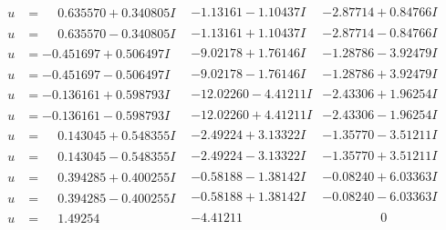 \documentclass[1p]{elsarticle_modified}
\theoremstyle{definition}
\begin{document}
$$\begin{array}{c|c|c}
\begin{aligned}
u &= \phantom{-}0.635570 + 0.340805 I\end{aligned}
 & -1.13161 - 1.10437 I & -2.87714 + 0.84766 I \\ \hline\begin{aligned}
u &= \phantom{-}0.635570 - 0.340805 I\end{aligned}
 & -1.13161 + 1.10437 I & -2.87714 - 0.84766 I \\ \hline\begin{aligned}
u &= -0.451697 + 0.506497 I\end{aligned}
 & -9.02178 + 1.76146 I & -1.28786 - 3.92479 I \\ \hline\begin{aligned}
u &= -0.451697 - 0.506497 I\end{aligned}
 & -9.02178 - 1.76146 I & -1.28786 + 3.92479 I \\ \hline\begin{aligned}
u &= -0.136161 + 0.598793 I\end{aligned}
 & -12.02260 - 4.41211 I & -2.43306 + 1.96254 I \\ \hline\begin{aligned}
u &= -0.136161 - 0.598793 I\end{aligned}
 & -12.02260 + 4.41211 I & -2.43306 - 1.96254 I \\ \hline\begin{aligned}
u &= \phantom{-}0.143045 + 0.548355 I\end{aligned}
 & -2.49224 + 3.13322 I & -1.35770 - 3.51211 I \\ \hline\begin{aligned}
u &= \phantom{-}0.143045 - 0.548355 I\end{aligned}
 & -2.49224 - 3.13322 I & -1.35770 + 3.51211 I \\ \hline\begin{aligned}
u &= \phantom{-}0.394285 + 0.400255 I\end{aligned}
 & -0.58188 - 1.38142 I & -0.08240 + 6.03363 I \\ \hline\begin{aligned}
u &= \phantom{-}0.394285 - 0.400255 I\end{aligned}
 & -0.58188 + 1.38142 I & -0.08240 - 6.03363 I \\ \hline\begin{aligned}
u &= \phantom{-}1.49254\phantom{ +0.000000I}\end{aligned}
 & -4.41211\phantom{ +0.000000I} & \phantom{-0.000000 } 0 \\ \hline\begin{aligned}

\end{aligned}
\end{array}$$
\end{document}
